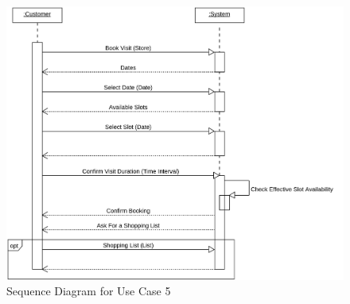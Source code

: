 \begin{figure}[H]
    \includegraphics[width=\textwidth]{Images/UML_Seq_Diag_5.png}
    \caption{\label{fig:Use_Case_Diag}Sequence Diagram for Use Case 5}
\end{figure}



